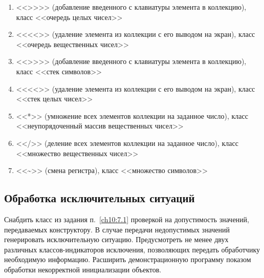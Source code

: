 \begin{enumerate}
\item <<{>}{>}>>  (добавление введенного с клавиатуры элемента в коллекцию), класс <<очередь целых
чисел>>
\item <<{<}{<}>> (удаление элемента из коллекции с его выводом на экран), класс <<очередь вещественных
чисел>>
\item <<{>}{>}>>  (добавление введенного с клавиатуры элемента в коллекцию), класс <<стек символов>>
\item <<{<}{<}>> (удаление элемента из коллекции с его выводом на экран), класс <<стек целых чисел>>
\item <<*>> (умножение всех элементов коллекции на заданное число), класс <<неупорядоченный массив вещественных чисел>>
\item <</>> (деление всех элементов коллекции на заданное число), класс <<множество вещественных чисел>>
\item <<\~{}>> (смена регистра), класс <<множество символов>>
\end{enumerate}
\subsection[Обработка исключительных ситуаций]{Обработка исключительных ситуаций}
Снабдить класс из задания п.~\ref{ch10:7.1} проверкой на допустимость значений, 
передаваемых конструктору. В случае передачи
недопустимых значений генерировать исключительную ситуацию. Предусмотреть не менее двух различных классов-индикаторов
исключения, позволяющих передать обработчику необходимую информацию. 
Расширить демонстрационную программу показом
обработки некорректной инициализации объектов. 

\renewcommand{\arraystretch}{1.0}
